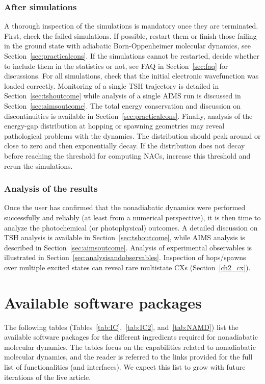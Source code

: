 \documentclass[9pt,bestpractices,pubversion]{livecoms}
\begin{document}
\subsubsection{After simulations}

A thorough inspection of the simulations is mandatory once they are terminated. First, check the failed simulations. If possible, restart them or finish those failing in the ground state with adiabatic Born-Oppenheimer molecular dynamics, see Section~\ref{sec:practicalcons}. If the simulations cannot be restarted, decide whether to include them in the statistics or not, see FAQ in Section~\ref{sec:faq} for discussions. For all simulations, check that the initial electronic wavefunction was loaded correctly. Monitoring of a single TSH trajectory is detailed in Section~\ref{sec:tshoutcome} while analysis of a single AIMS run is discussed in Section~\ref{sec:aimsoutcome}. The total energy conservation and discussion on discontinuities is available in Section~\ref{sec:practicalcons}. Finally, analysis of the energy-gap distribution at hopping or spawning geometries may reveal pathological problems with the dynamics. The distribution should peak around or close to zero and then exponentially decay. If the distribution does not decay before reaching the threshold for computing NACs, increase this threshold and rerun the simulations.

\subsubsection{Analysis of the results}

Once the user has confirmed that the nonadiabatic dynamics were performed successfully and reliably (at least from a numerical perspective), it is then time to analyze the photochemical (or photophysical) outcomes. A detailed discussion on TSH analysis is available in Section~\ref{sec:tshoutcome}, while AIMS analysis is described in Section~\ref{sec:aimsoutcome}.
Analysis of experimental observables is illustrated in Section~\ref{sec:analysisandobservables}. Inspection of hops/spawns over multiple excited states can reveal rare multistate CXs (Section~\ref{ch2_cx}).


\section{Available software packages}
\label{sec:codes}
The following tables (Tables~\ref{tab:IC},~\ref{tab:IC2}, and~\ref{tab:NAMD}) list the available software packages for the different ingredients required for nonadiabatic molecular dynamics. The tables focus on the capabilities related to nonadiabatic molecular dynamics, and the reader is referred to the links provided for the full list of functionalities (and interfaces). We expect this list to grow with future iterations of the live article.
\end{document}
